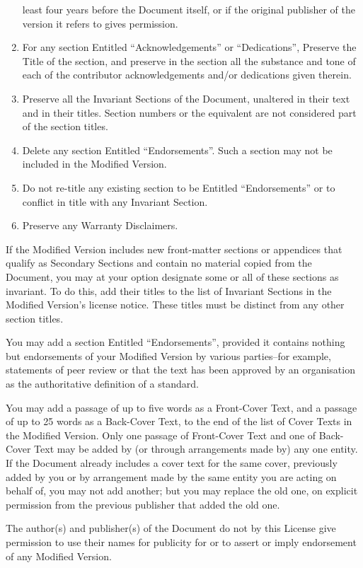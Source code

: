 \documentclass[10pt,a4paper,titlepage,twoside,openright]{report}
\begin{document}
\begin{enumerate}
   least four years before the Document itself, or if the original
   publisher of the version it refers to gives permission.
\item For any section Entitled ``Acknowledgements'' or ``Dedications'',
   Preserve the Title of the section, and preserve in the section all
   the substance and tone of each of the contributor acknowledgements
   and/or dedications given therein.
\item Preserve all the Invariant Sections of the Document,
   unaltered in their text and in their titles.  Section numbers
   or the equivalent are not considered part of the section titles.
\item Delete any section Entitled ``Endorsements''.  Such a section
   may not be included in the Modified Version.
\item Do not re-title any existing section to be Entitled ``Endorsements''
   or to conflict in title with any Invariant Section.
\item Preserve any Warranty Disclaimers.
\end{enumerate}

If the Modified Version includes new front-matter sections or
appendices that qualify as Secondary Sections and contain no material
copied from the Document, you may at your option designate some or all
of these sections as invariant.  To do this, add their titles to the
list of Invariant Sections in the Modified Version's license notice.
These titles must be distinct from any other section titles.

You may add a section Entitled ``Endorsements'', provided it contains
nothing but endorsements of your Modified Version by various
parties--for example, statements of peer review or that the text has
been approved by an organisation as the authoritative definition of a
standard.

You may add a passage of up to five words as a Front-Cover Text, and a
passage of up to 25 words as a Back-Cover Text, to the end of the list
of Cover Texts in the Modified Version.  Only one passage of
Front-Cover Text and one of Back-Cover Text may be added by (or
through arrangements made by) any one entity.  If the Document already
includes a cover text for the same cover, previously added by you or
by arrangement made by the same entity you are acting on behalf of,
you may not add another; but you may replace the old one, on explicit
permission from the previous publisher that added the old one.

The author(s) and publisher(s) of the Document do not by this License
give permission to use their names for publicity for or to assert or
imply endorsement of any Modified Version.
\end{document}
